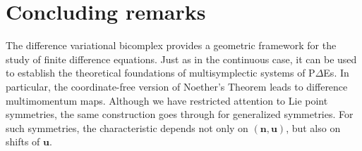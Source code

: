 \documentclass[11pt]{article} %
\numberwithin{equation}{section}
\newcommand{\mbn}{\mathbf{n}}
\newcommand{\mbu}{\mathbf{u}}
\theoremstyle{plain}
\theoremstyle{definition}
\begin{document}
\section{Concluding remarks}
The difference variational bicomplex provides a geometric framework for the study of finite difference equations. Just as in the continuous case, it can be used to establish the theoretical foundations of multisymplectic systems of P$\Delta$Es. In particular, the coordinate-free version of Noether's Theorem leads to difference multimomentum maps. Although we have restricted attention to Lie point symmetries, the same construction goes through for generalized symmetries. For such symmetries, the characteristic depends not only on $(\mbn,\mbu)$, but also on shifts of $\mbu$.
\end{document}
